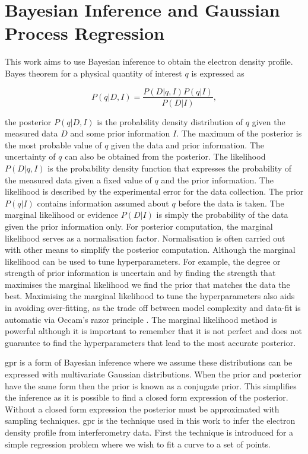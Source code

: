 \section{Bayesian Inference and Gaussian Process Regression}\label{sec:BIandGPR}

This work aims to use Bayesian inference to obtain the electron density profile. Bayes theorem for a physical quantity of interest $q$ is expressed as 

\begin{equation} 
  P(q|D,I) = \frac{P(D|q,I) P(q|I)}{P(D|I)},
  \label{eq:bayesth}
\end{equation}

\noindent the posterior $P(q|D,I)$ is the probability density distribution of $q$ given the measured data $D$ and some prior information $I$. The maximum of the posterior is the most probable value of $q$ given the data and prior information. The uncertainty of $q$ can also be obtained from the posterior. The likelihood $P(D|q,I)$ is the probability density function that expresses the probability of the measured data given a fixed value of $q$ and the prior information. The likelihood is described by the experimental error for the data collection. The prior $P(q|I)$ contains information assumed about $q$ before the data is taken. The marginal likelihood or evidence $P(D|I)$ is simply the probability of the data given the prior information only. For posterior computation, the marginal likelihood serves as a normalisation factor. Normalisation is often carried out with other means to simplify the posterior computation. Although the marginal likelihood can be used to tune hyperparameters. For example, the degree or strength of prior information is uncertain and by finding the strength that maximises the marginal likelihood we find the prior that matches the data the best. Maximising the marginal likelihood to tune the hyperparameters also aids in avoiding over-fitting, as the trade off between model complexity and data-fit is automatic via Occam's razor principle \cite{oscraz}. The marginal likelihood method is powerful although it is important to remember that it is not perfect and does not guarantee to find the hyperparameters that lead to the most accurate posterior.

\gls{gpr} is a form of Bayesian inference where we assume these distributions can be expressed with multivariate Gaussian distributions. When the prior and posterior have the same form then the prior is known as a conjugate prior. This simplifies the inference as it is possible to find a closed form expression of the posterior. Without a closed form expression the posterior must be approximated with sampling techniques. \gls{gpr} is the technique used in this work to infer the electron density profile from interferometry data. First the technique is introduced for a simple regression problem where we wish to fit a curve to a set of points.

